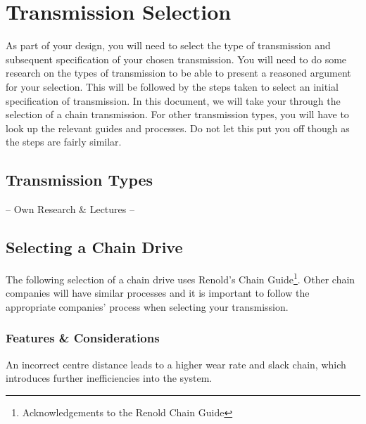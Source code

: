 \section{Transmission Selection}

As part of your design, you will need to select the type of transmission and subsequent specification of your chosen transmission. You will need to do some research on the types of transmission to be able to present a reasoned argument for your selection. This will be followed by the steps taken to select an initial specification of transmission. In this document, we will take your through the selection of a chain transmission. For other transmission types, you will have to look up the relevant guides and processes. Do not let this put you off though as the steps are fairly similar.

\subsection{Transmission Types}

\begin{framed}
    \vspace{1cm}
    \begin{center}
        \Large
        -- Own Research \& Lectures --
    \end{center}
    \vspace{1cm}
\end{framed}

\subsection{Selecting a Chain Drive}

The following selection of a chain drive uses Renold's Chain Guide\footnote{Acknowledgements to the Renold Chain Guide}. Other chain companies will have similar processes and it is important to follow the appropriate companies' process when selecting your transmission.

\subsubsection{Features \& Considerations}

An  incorrect centre distance leads to a higher wear rate and slack chain, which introduces further inefficiencies into the system. %

